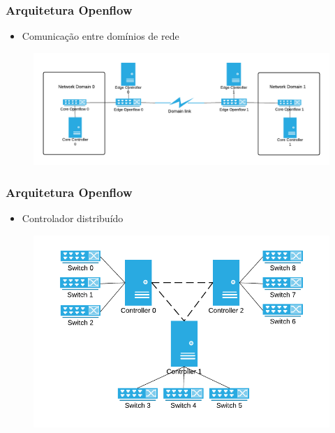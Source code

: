 %
%
\begin{frame}\frametitle{Arquitetura Openflow}

    \begin{itemize}
    \item Comunicação entre domínios de rede
    \end{itemize}
    
   
	\begin{figure}[h]\hspace*{-1cm}
        \centering
        \includegraphics[scale=0.3]{images/edge-core-sdn.png}
    \end{figure}
\end{frame}



%
%
\begin{frame}\frametitle{Arquitetura Openflow}

    \begin{itemize}
    \item Controlador distribuído
    \end{itemize}
    
	\begin{figure}[h]
        \centering
        \includegraphics[scale=0.4]{images/distributed_sdn_controller.png}
    \end{figure}
\end{frame}